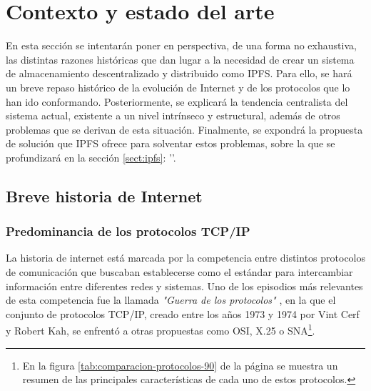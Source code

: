 \chapter{Contexto y estado del arte}\label{chap:2contexto}

En esta sección se intentarán poner en perspectiva, de una forma no exhaustiva, las distintas razones
históricas que dan lugar a la necesidad de crear un sistema de almacenamiento descentralizado y distribuido como IPFS.
Para ello, se hará un breve repaso histórico de la evolución de Internet y de los protocolos que lo han ido conformando.
Posteriormente, se explicará la tendencia centralista del sistema actual, existente a un nivel intrínseco y estructural,
además de otros problemas que se derivan de esta situación.
Finalmente, se expondrá la propuesta de solución que IPFS ofrece para solventar estos problemas, sobre la que se profundizará en la sección \ref{sect:ipfs}: ''.

\section{Breve historia de Internet}
\subsection{Predominancia de los protocolos TCP/IP}
La historia de internet está marcada por la competencia entre distintos protocolos de comunicación que buscaban establecerse
como el estándar para intercambiar información entre diferentes redes y sistemas. Uno de los episodios más relevantes de esta
competencia fue la llamada \textit{"Guerra de los protocolos"} \cite{ProtocolWars2023}, en la que el conjunto de protocolos TCP/IP, creado entre los
años 1973 y 1974 por Vint Cerf y Robert Kah, se enfrentó a otras propuestas como OSI, X.25 o SNA\footnote{En la figura \ref{tab:comparacion-protocolos-90} de la página \pageref{tab:comparacion-protocolos-90} se muestra un resumen de las principales características de cada uno de estos protocolos.
}.

